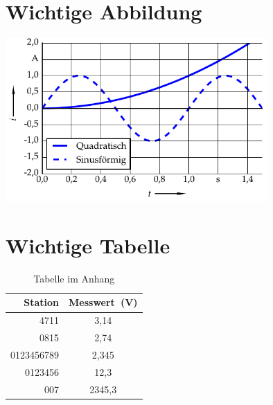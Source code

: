 
\appendix

\chapter{Wichtige Abbildung}

\label{chap:Wichtige-Abbildung}\includegraphics[width=10cm]{figures/01plot/plotdin}

\chapter{Wichtige Tabelle}

\label{chap:Wichtige-Tabelle}%
\begin{longtable}[c]{|r|c|}
\caption{Tabelle im Anhang \label{tab:wichtigetabelle}}
\tabularnewline
\hline 
\textbf{Station} & \textbf{Messwert~(V)}\tabularnewline
\endfirsthead
\hline 
4711 & \hphantom{000}3,14\hphantom{0}\tabularnewline
\hline 
0815 & \phantom{000}2,74\hphantom{0}\tabularnewline
\hline 
0123456789 & \hphantom{000}2,345\tabularnewline
\hline 
0123456 & \hphantom{00}12,3\hphantom{00}\tabularnewline
\hline 
007 & 2345,3\hphantom{00}\tabularnewline
\hline 
\end{longtable}

